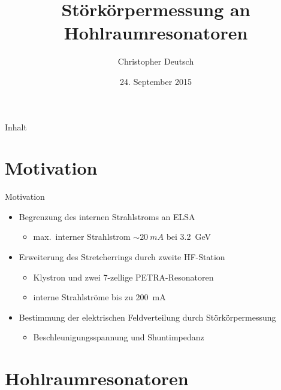 \documentclass[12pt,xcolor=dvipsnames,professionalfonts]{beamer}
\author[Christopher Deutsch]
{Christopher Deutsch}
\title
{Störkörpermessung an Hohlraumresonatoren}
\subtitle
{}
\institute[]
{Physikalisches Institut der Universität Bonn\\
Seminar zur Bachelorarbeit}
\date{24. September 2015}
\begin{document}
\maketitle

\begin{frame}{Inhalt}
	\tableofcontents
\end{frame}

\section{Motivation}
\begin{frame}{Motivation}
	\begin{itemize}
		\item Begrenzung des internen Strahlstroms an ELSA
		\begin{itemize}
			\setlength\itemsep{0.25em}
			\item max.\ interner Strahlstrom  $\sim\SI{20}{mA}$ bei \SI{3.2}{GeV}
		\end{itemize}
		\vfill
		
		\item Erweiterung des Stretcherrings durch zweite HF-Station
		\begin{itemize}
			\setlength\itemsep{0.25em}
			\item Klystron und zwei 7-zellige PETRA-Resonatoren
			\item interne Strahlströme bis zu \SI{200}{mA}
		\end{itemize}
		\vfill
		
		\item Bestimmung der elektrischen Feldverteilung durch Störkörpermessung
		\begin{itemize}
			\setlength\itemsep{0.25em}
			\item Beschleunigungsspannung und Shuntimpedanz
		\end{itemize}
	\end{itemize}
\end{frame}


\section{Hohlraumresonatoren}
\end{document}
